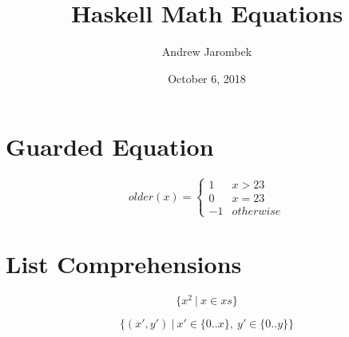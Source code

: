 \documentclass[a4paper, 12pt]{article}
\begin{document}
	
	\title{Haskell Math Equations}
	\author{Andrew Jarombek}
	\date{October 6, 2018}
	\maketitle
	
	\section{Guarded Equation}
	
	$$
	older(x) = \begin{cases}
		1 & x > 23 \\
		0 & x = 23 \\
		-1 & otherwise
		\end{cases}
	$$
	
	\section{List Comprehensions}
	
	$$
	\{x^2 \: | \: x \in xs\}
	$$
	
	$$
	\{(x', y') \: | \: x' \in \{0..x\}, \: y' \in \{0..y\}\}
	$$
	
\end{document}
